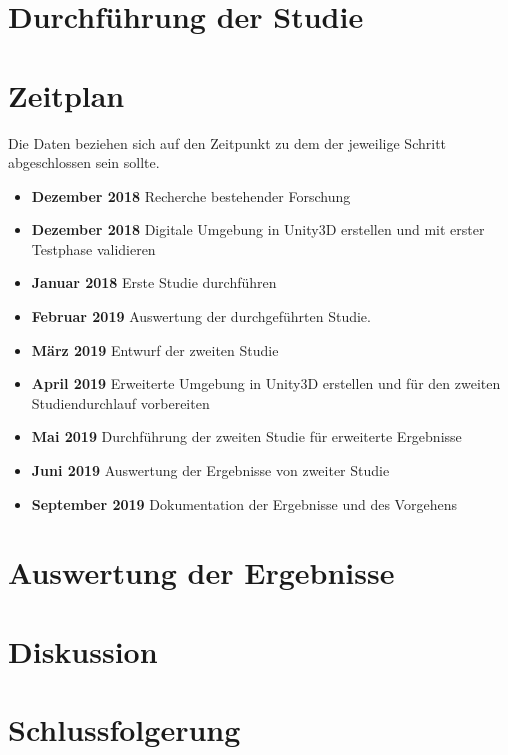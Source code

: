 \documentclass[a4paper, 11pt]{article}
\begin{document}
\section*{Durchführung der Studie}

\section*{Zeitplan}
Die Daten beziehen sich auf den Zeitpunkt zu dem der jeweilige Schritt abgeschlossen sein sollte.
\begin{itemize}
    \item \textbf{Dezember 2018} Recherche bestehender Forschung
    \item \textbf{Dezember 2018} Digitale Umgebung in Unity3D erstellen und mit erster Testphase validieren
    \item \textbf{Januar 2018} Erste Studie durchführen
    \item \textbf{Februar 2019} Auswertung der durchgeführten Studie.
    \item \textbf{März 2019} Entwurf der zweiten Studie
    \item \textbf{April 2019} Erweiterte Umgebung in Unity3D erstellen und für den zweiten Studiendurchlauf vorbereiten
    \item \textbf{Mai 2019} Durchführung der zweiten Studie für erweiterte Ergebnisse
    \item \textbf{Juni 2019} Auswertung der Ergebnisse von zweiter Studie
    \item \textbf{September 2019} Dokumentation der Ergebnisse und des Vorgehens
\end{itemize}

\section*{Auswertung der Ergebnisse}

\section*{Diskussion}

\section*{Schlussfolgerung}
\end{document}
